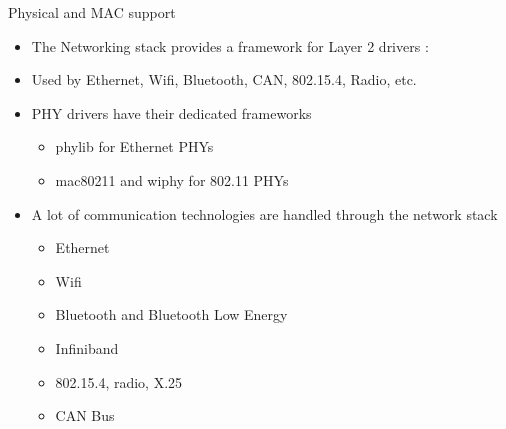 \begin{frame}{Physical and MAC support}
	\begin{itemize}
		\item The Networking stack provides a framework for Layer 2 drivers : 
		\item Used by Ethernet, Wifi, Bluetooth, CAN, 802.15.4, Radio, etc.
		\item PHY drivers have their dedicated frameworks
			\begin{itemize}
				\item phylib for Ethernet PHYs
				\item mac80211 and wiphy for 802.11 PHYs
			\end{itemize}
		\item A lot of communication technologies are handled through the network stack
			\begin{itemize}
				\item Ethernet
				\item Wifi
				\item Bluetooth and Bluetooth Low Energy
				\item Infiniband
				\item 802.15.4, radio, X.25
				\item CAN Bus
			\end{itemize}
	\end{itemize}
\end{frame}

